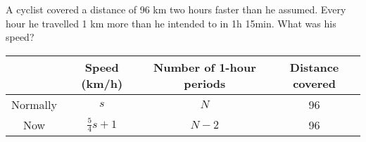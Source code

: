 
%
%
%
%
% 
% 

\question A cyclist covered a distance of 96 km two hours faster than he assumed. Every hour
he travelled 1 km more than he intended to in 1h 15min. What was his speed?

\insertQR{}

\ifprintanswers
  \begin{table}
  	\begin{tabular}{cccc}
  	    \toprule
  		& Speed (km/h) & Number of 1-hour periods & Distance covered \\
  		\midrule
  		Normally & $s$ & $N$ & 96 \\
  		Now & $\frac{5}{4}s + 1$ & $N-2$ & 96 \\
  		\bottomrule
  	
  	\end{tabular}
  \end{table}
\fi 

